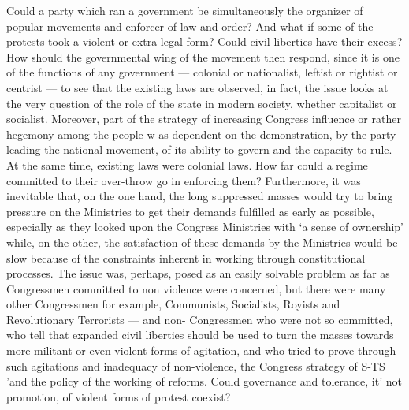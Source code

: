 Could a party which ran a government be simultaneously the organizer of popular movements and enforcer of law and order? And what if some of the protests took a violent or extra-legal form? Could civil liberties have their excess? How should the governmental wing of the movement then respond, since it is one of the functions of any government --- colonial or nationalist, leftist or rightist or centrist --- to see that the existing laws are observed, in fact, the issue looks at the very question of the role of the state in modern society, whether capitalist or socialist. Moreover, part of the strategy of increasing Congress influence or rather hegemony among the people w as dependent on the demonstration, by the party leading the national movement, of its ability to govern and the capacity to rule. At the same time, existing laws were colonial laws. How far could a regime committed to their over-throw go in enforcing them? Furthermore, it was inevitable that, on the one hand, the long suppressed masses would try to bring pressure on the Ministries to get their demands fulfilled as early as possible, especially as they looked upon the Congress Ministries with `a sense of ownership' while, on the other, the satisfaction of these demands by the Ministries would be slow because of the constraints inherent in working through constitutional processes. The issue was, perhaps, posed as an easily solvable problem as far as Congressmen committed to non violence were concerned, but there were many other Congressmen for example, Communists, Socialists, Royists and Revolutionary Terrorists --- and non- Congressmen who were not so committed, who tell that expanded civil liberties should be used to turn the masses towards more militant or even violent forms of agitation, and who tried to prove through such agitations and inadequacy of non-violence, the Congress strategy of S-TS 'and the policy of the working of reforms. Could governance and tolerance, it' not promotion, of violent forms of protest coexist? 

